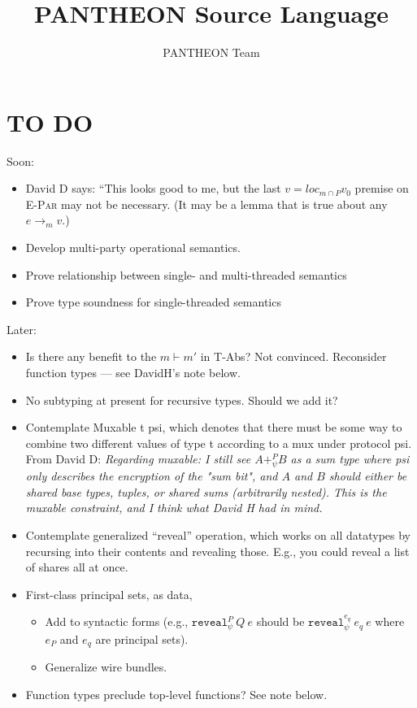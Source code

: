 \documentclass[10pt]{article}
\title{PANTHEON Source Language}
\author{PANTHEON Team}
\newcommand{\rulelab}[1]{{\small \textsc{#1}}}
\newcommand{\kw}[1]{\ensuremath{\mathtt{#1}}}
\newcommand{\ereveal}[4]{\ensuremath{\kw{reveal}^{#1}_{#4}~{#2}~{#3}}}
\begin{document}
\maketitle

\section{TO DO}

Soon:
\begin{itemize}
\item David D says: ``This looks good to me, but the last $v = loc_{m
    \cap P} v_0$ premise on \rulelab{E-Par} may not be necessary. (It may be a lemma that is
  true about any $e \longrightarrow_m v$.)
\item Develop multi-party operational semantics.
\item Prove relationship between single- and multi-threaded semantics
\item Prove type soundness for single-threaded semantics
\end{itemize}


\noindent
Later:
\begin{itemize}
\item Is there any benefit to the $m \vdash m'$ in T-Abs? Not
  convinced. Reconsider function types --- see DavidH's note below.
\item No subtyping at present for recursive types. Should we add
  it?
\item Contemplate Muxable t psi, which denotes that there must be some
  way to combine two different values of type t according to a mux
  under protocol psi. From David D: \emph{Regarding muxable: I still see $A +^P_{\psi} B$ as a sum type where psi only describes the encryption of the "sum bit", and $A$ and $B$ should either be shared base types, tuples, or shared sums (arbitrarily nested). This is the muxable constraint, and I think what David H had in mind.}
\item Contemplate generalized ``reveal'' operation, which works on all
  datatypes by recursing into their contents and revealing
  those. E.g., you could reveal a list of shares all at once.
\item First-class principal sets, as data,
  \begin{itemize}
    \item Add to syntactic forms (e.g., $\ereveal{P}{Q}{e}{\psi}$ should be
    $\ereveal{e_q}{e_q}{e}{\psi}$ where $e_P$ and $e_q$ are principal
    sets).
  \item Generalize wire bundles.
  \end{itemize}
\item Function types preclude top-level functions? See note below.
\end{itemize}
\end{document}
